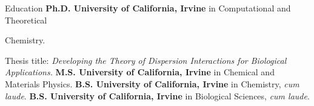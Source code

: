 \begin{rubric}{Education}
  \textbf{Ph.D. University of California, Irvine} in Computational and Theoretical

  Chemistry.
  \par Thesis title: \emph{Developing the Theory of Dispersion Interactions for Biological Applications.}
%
  \textbf{M.S. University of California, Irvine} in Chemical and Materials Physics.
%
  \textbf{B.S. University of California, Irvine} in Chemistry, \textit{cum laude}.
%
  \textbf{B.S. University of California, Irvine} in Biological Sciences, \textit{cum laude}.
\end{rubric}

